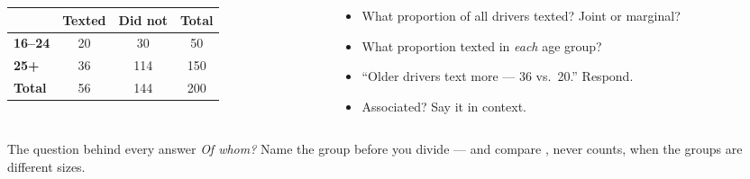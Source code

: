 \documentclass[aspectratio=169, 11pt]{beamer}
\begin{document}
\begin{frame}[t, plain]
  \begin{columns}[t]
    \begin{column}{0.46\textwidth}
      \begin{center}
      \renewcommand{\arraystretch}{1.25}
      \begin{tabular}{l | c c | c}
         & \textbf{Texted} & \textbf{Did not} & \textbf{Total} \\ \hline
        \textbf{16--24} & 20 & 30 & 50 \\
        \textbf{25+} & 36 & 114 & 150 \\ \hline
        \textbf{Total} & 56 & 144 & 200 \\
      \end{tabular}
      \end{center}
    \end{column}
    \begin{column}{0.50\textwidth}
      \begin{itemize}\setlength{\itemsep}{5pt}
        \item What proportion of all drivers texted? Joint or marginal?
        \item What proportion texted in \emph{each} age group?
        \item ``Older drivers text more --- 36 vs.\ 20.'' Respond.
        \item Associated? Say it in context.
      \end{itemize}
    \end{column}
  \end{columns}
  \vspace{8pt}
  \begin{block}{The question behind every answer}
    \emph{Of whom?} Name the group before you divide --- and compare , never
    counts, when the groups are different sizes.
  \end{block}
\end{frame}
\end{document}
